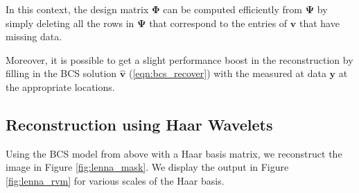 In this context, the design matrix $\bm\Phi$ can be computed efficiently from $\bm\Psi$ by simply deleting all the rows in $\bm\Psi$ that correspond to the entries of $\bm v$ that have missing data.

Moreover, it is possible to get a slight performance boost in the reconstruction by filling in the BCS solution $\bm{\hat v}$ (\ref{eqn:bcs_recover}) with the measured at data $\bm y$ at the appropriate locations.

\subsection{Reconstruction using Haar Wavelets}
Using the BCS model from above with a Haar basis matrix, we reconstruct the image in Figure \ref{fig:lenna_mask}.
We display the output in Figure \ref{fig:lenna_rvm} for various scales of the Haar basis.
